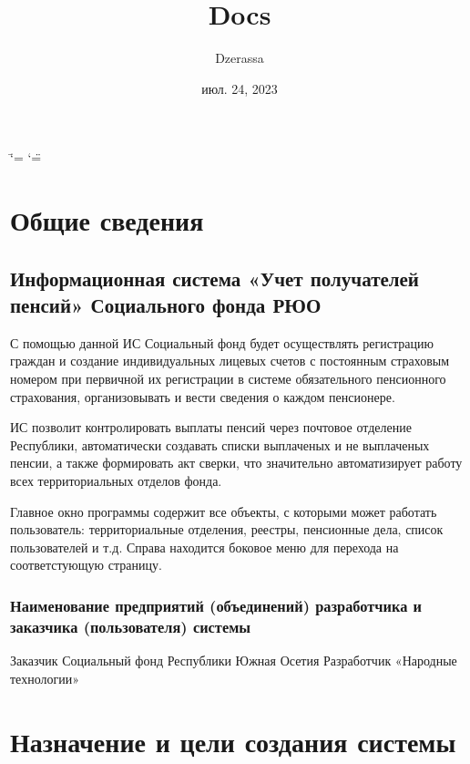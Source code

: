 \documentclass[letterpaper,10pt,russian]{sphinxmanual}
\title{Docs}
\date{июл. 24, 2023}
\author{Dzerassa}
\begin{document}
\ifdefined\shorthandoff
  \ifnum\catcode`\=\string=\active\shorthandoff{=}\fi
  \ifnum\catcode`\"=\active{}\fi
\fi

\pagestyle{empty}
\sphinxmaketitle
\pagestyle{plain}
\sphinxtableofcontents
\pagestyle{normal}
\label{\detokenize{index::doc}}


\sphinxstepscope


\chapter{Общие сведения}
\label{\detokenize{common:id1}}\label{\detokenize{common::doc}}

\section{Информационная система «Учет получателей пенсий» Социального фонда РЮО}
\label{\detokenize{common:id2}}
\sphinxAtStartPar
С помощью данной ИС Социальный фонд будет осуществлять регистрацию граждан и создание индивидуальных лицевых счетов с постоянным страховым номером при первичной их регистрации
в системе обязательного пенсионного страхования, организовывать и вести сведения о каждом пенсионере.

\sphinxAtStartPar
ИС позволит контролировать выплаты пенсий через почтовое отделение Республики, автоматически создавать списки выплаченых и не выплаченых пенсии, а также формировать акт сверки,
что значительно автоматизирует работу всех территориальных отделов фонда.

\sphinxAtStartPar
Главное окно программы содержит все объекты, с которыми может работать пользователь: территориальные отделения, реестры, пенсионные дела, список пользователей и т.д.
Справа находится боковое меню для перехода на соответстующую страницу.


\subsection{Наименование предприятий (объединений) разработчика и заказчика (пользователя) системы}
\label{\detokenize{common:id3}}
\sphinxAtStartPar
Заказчик \sphinxhyphen{} Социальный фонд Республики Южная Осетия
Разработчик \sphinxhyphen{} «Народные технологии»

\sphinxstepscope


\chapter{Назначение и цели создания системы}
\label{\detokenize{goals:id1}}\label{\detokenize{goals::doc}}
\end{document}

